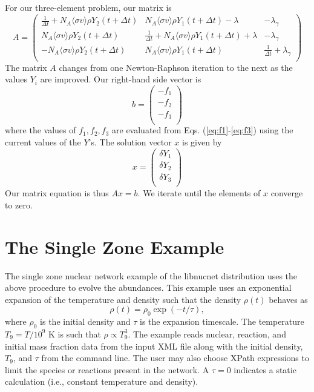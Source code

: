 \documentclass{article}    %
\begin{document}
For our three-element problem, our matrix is
\begin{equation}
A =
 \left(
  \begin{array}{ccc}
    \frac{1}{\Delta t} + N_A \langle \sigma v \rangle \rho Y_2 ( t + \Delta t ) & N_A \langle \sigma v \rangle \rho Y_1 ( t + \Delta t ) - \lambda & -\lambda_\gamma \\
    N_A \langle \sigma v \rangle \rho Y_2 ( t + \Delta t ) & \frac{1}{\Delta t} + N_A \langle \sigma v \rangle \rho Y_1 ( t + \Delta t ) + \lambda & -\lambda_\gamma \\
    -N_A \langle \sigma v \rangle \rho Y_2 ( t + \Delta t ) & N_A \langle \sigma v \rangle \rho Y_1 ( t + \Delta t ) & \frac{1}{\Delta t} + \lambda_\gamma \\
  \end{array}
\right)
\end{equation}
The matrix $A$ changes from one Newton-Raphson iteration to the next
as the values $Y_i$ are improved. Our right-hand side vector
is
\begin{equation}
b = \left(
  \begin{array}{c}
    -f_1 \\
    -f_2 \\
    -f_3 \\
  \end{array}
\right)
\end{equation}
where the values of $f_1,f_2,f_3$ are evaluated from Eqs.
(\ref{eq:f1}-\ref{eq:f3}) using the current values of the $Y$'s.
The solution vector $x$ is given by
\begin{equation}
x = \left(
  \begin{array}{c}
    \delta Y_1 \\
    \delta Y_2 \\
    \delta Y_3 \\
  \end{array}
\right)
\end{equation}
Our matrix equation is thus $Ax = b$.  We iterate until the elements
of $x$ converge to zero.

\section{The Single Zone Example}

The single zone nuclear network example of the libnucnet
distribution uses the above procedure to evolve the abundances. This
example uses an exponential expansion of the temperature and density
such that the density $\rho(t)$ behaves as
\begin{equation}
\rho(t) = \rho_0 \exp({-t/\tau}),  \label{eq:rhot}
\end{equation}
where $\rho_0$ is the initial density and $\tau$ is the expansion
timescale.  The temperature $T_9 = T/10^9$ K is such that $\rho \propto
T_9^3$.  The example reads nuclear, reaction, and initial mass
fraction data from the input XML file along with the initial
density, $T_9$, and $\tau$ from the command line.  The user may also
choose XPath expressions to limit the species or reactions present
in the network.  A $\tau = 0$ indicates a static calculation (i.e.,
constant temperature and density).
\end{document}
